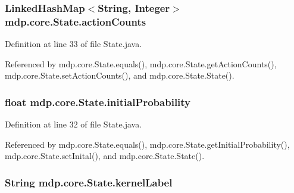 \subsubsection[{action\+Counts}]{\setlength{\rightskip}{0pt plus 5cm}Linked\+Hash\+Map$<$String, Integer$>$ mdp.\+core.\+State.\+action\+Counts\hspace{0.3cm}{\ttfamily [private]}}\label{classmdp_1_1core_1_1_state_a56e17de2fde7a7f4ee8b1491c11438d5}


Definition at line 33 of file State.\+java.



Referenced by mdp.\+core.\+State.\+equals(), mdp.\+core.\+State.\+get\+Action\+Counts(), mdp.\+core.\+State.\+set\+Action\+Counts(), and mdp.\+core.\+State.\+State().

\hypertarget{classmdp_1_1core_1_1_state_a237d2d5f81db0553a2180cf66a20472b}{}
\subsubsection[{initial\+Probability}]{\setlength{\rightskip}{0pt plus 5cm}float mdp.\+core.\+State.\+initial\+Probability\hspace{0.3cm}{\ttfamily [private]}}\label{classmdp_1_1core_1_1_state_a237d2d5f81db0553a2180cf66a20472b}


Definition at line 32 of file State.\+java.



Referenced by mdp.\+core.\+State.\+equals(), mdp.\+core.\+State.\+get\+Initial\+Probability(), mdp.\+core.\+State.\+set\+Inital(), and mdp.\+core.\+State.\+State().

\hypertarget{classmdp_1_1core_1_1_state_ac7ca184df7a0ec4141766692290c18ab}{}
\subsubsection[{kernel\+Label}]{\setlength{\rightskip}{0pt plus 5cm}String mdp.\+core.\+State.\+kernel\+Label\hspace{0.3cm}{\ttfamily [private]}}\label{classmdp_1_1core_1_1_state_ac7ca184df7a0ec4141766692290c18ab}


